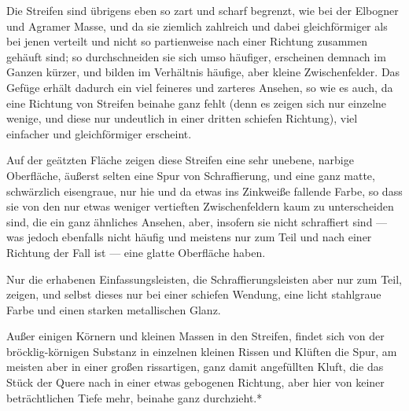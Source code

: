 \documentclass[a4paper, 11pt, oneside, german]{article}
\begin{document}
Die Streifen sind übrigens eben so zart und scharf begrenzt, wie bei der Elbogner und Agramer Masse, und da sie ziemlich zahlreich und dabei gleichförmiger als bei jenen verteilt und nicht so partienweise nach einer Richtung zusammen gehäuft sind; so durchschneiden sie sich umso häufiger, erscheinen demnach im Ganzen kürzer, und bilden im Verhältnis häufige, aber kleine Zwischenfelder. Das Gefüge erhält dadurch ein viel feineres und zarteres Ansehen, so wie es auch, da eine Richtung von Streifen beinahe ganz fehlt (denn es zeigen sich nur einzelne wenige, und diese nur undeutlich in einer dritten schiefen Richtung), viel einfacher und gleichförmiger erscheint.

Auf der geätzten Fläche zeigen diese Streifen eine sehr unebene, narbige Oberfläche, äußerst selten eine Spur von Schraffierung, und eine ganz matte, schwärzlich eisengraue, nur hie und da etwas ins Zinkweiße fallende Farbe, so dass sie von den nur etwas weniger vertieften Zwischenfeldern kaum zu unterscheiden sind, die ein ganz ähnliches Ansehen, aber, insofern sie nicht schraffiert sind --- was jedoch ebenfalls nicht häufig und meistens nur zum Teil und nach einer Richtung der Fall ist --- eine glatte Oberfläche haben.

Nur die erhabenen Einfassungsleisten, die Schraffierungsleisten aber nur zum Teil, zeigen, und selbst dieses nur bei einer schiefen Wendung, eine licht stahlgraue Farbe und einen starken metallischen Glanz.

Außer einigen Körnern und kleinen Massen in den Streifen, findet sich von der bröcklig-körnigen Substanz in einzelnen kleinen Rissen und Klüften die Spur, am meisten aber in einer großen rissartigen, ganz damit angefüllten Kluft, die das Stück der Quere nach in einer etwas gebogenen Richtung, aber hier von keiner beträchtlichen Tiefe mehr, beinahe ganz durchzieht.*
\end{document}
